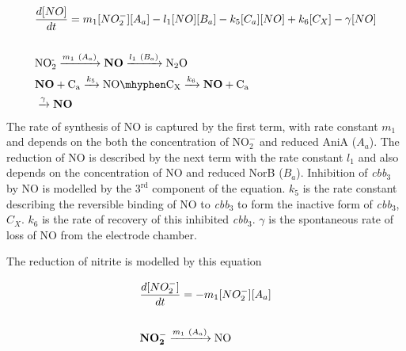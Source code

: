 \begin{eqnarray}
&\frac{d[NO]}{dt} = m_{1}[NO_2^-][A_a] - l_1[NO][B_a] - k_5[C_a][NO] + k_6 [C_X] - \gamma[NO] \nonumber \\\nonumber \\
&\textnormal{NO$_\textnormal{2}^\textnormal{-}$} \xrightarrow{m_1~(A_a)} \mathbf{NO} \xrightarrow{l_1~(B_a)} \textnormal{N$_\textnormal{2}$O} \nonumber \\
&\mathbf{NO} + \textnormal{C$_\textnormal{a}$} \xrightarrow{k_5} \textnormal{NO}\mhyphen \textnormal{C$_\textnormal{X}$} \xrightarrow{k_6} \mathbf{NO} + \textnormal{C$_\textnormal{a}$} \nonumber \\
&\xrightarrow{\gamma} \mathbf{NO}
\label{eq:no}
\end{eqnarray}
The rate of synthesis of NO is captured by the first term, with rate constant $m_{1}$ and depends on the both the concentration of $\mathrm{NO}_\mathrm{2}^\mathrm{-}$ and reduced AniA ($A_a$). The reduction of NO is described by the next term with the rate constant $l_1$ and also depends on the concentration of NO and reduced NorB ($B_a$). Inhibition of \textit{cbb$_{\textrm{3}}$} by NO is modelled by the $\mathrm{3}^\mathrm{rd}$ component of the equation. $k_5$ is the rate constant describing the reversible binding of NO to \textit{cbb$_{\textrm{3}}$} to form the inactive form of \textit{cbb$_{\textrm{3}}$}, $C_X$. $k_6$ is the rate of recovery of this inhibited \textit{cbb$_{\textrm{3}}$}. $\gamma$ is the spontaneous rate of loss of NO from the electrode chamber.

The reduction of nitrite is modelled by this equation

\begin{eqnarray}
&\frac{d[NO_2^-]}{dt} = - m_{1}[NO_2^-][A_a] \nonumber \\\nonumber \\
&\mathbf{NO_2^-} \xrightarrow{m_1~(A_a)} \textnormal{NO}
\label{eq:nitrite}
\end{eqnarray}

